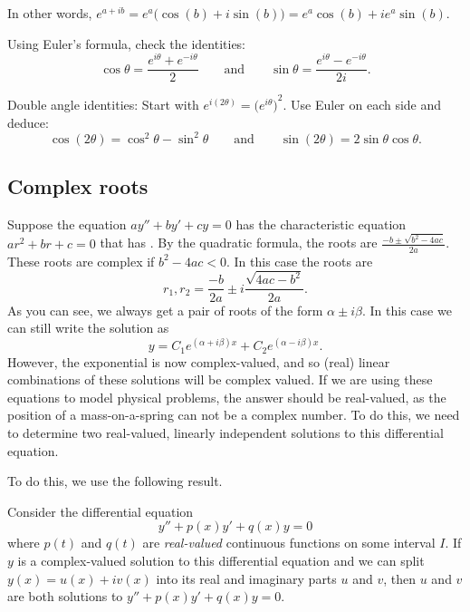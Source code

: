 In other words, $e^{a+ib} = e^a \bigl( \cos(b) + i \sin(b) \bigr) = e^a \cos(b) + i e^a \sin(b)$.

\begin{exercise}
Using Euler's formula, check the identities:
\begin{equation*}
\cos \theta = \frac{e^{i \theta} + e^{-i \theta}}{2}
\qquad \text{and} \qquad
\sin \theta = \frac{e^{i \theta} - e^{-i \theta}}{2i}.
\end{equation*}
\end{exercise}

\begin{exercise}
Double angle identities:
Start with $e^{i(2\theta)} = {\bigl(e^{i \theta} \bigr)}^2$.  Use Euler on
each side and deduce:
\begin{equation*}
\cos (2\theta) = \cos^2 \theta - \sin^2 \theta
\qquad \text{and} \qquad
\sin (2\theta) = 2 \sin \theta \cos \theta .
\end{equation*}
\end{exercise}

\subsection{Complex roots}

Suppose the equation $ay'' + by' + cy = 0$ has the 
characteristic equation
$a r^2 + b r + c = 0$ that has .
By the quadratic
formula, the roots are
$\frac{-b \pm \sqrt{b^2 - 4ac}}{2a}$.
These roots are complex if $b^2 - 4ac < 0$.  In this case the
roots are
\begin{equation*}
r_1, r_2 = \frac{-b}{2a} \pm i\frac{\sqrt{4ac - b^2}}{2a} .
\end{equation*}
As you can see, we always get a pair of roots of the form $\alpha \pm i
\beta$.  In this case we can still write the solution as
\begin{equation*}
y = C_1 e^{(\alpha+i\beta)x} + C_2 e^{(\alpha-i\beta)x} .
\end{equation*}
However, the exponential is now complex-valued, and so (real) linear combinations of these solutions will be complex valued. If we are using these equations to model physical problems, the answer should be real-valued, as the position of a mass-on-a-spring can not be a complex number. To do this, we need to determine two real-valued, linearly independent solutions to this differential equation.

To do this, we use the following result.

\begin{theorem1}{}
Consider the differential equation 
\begin{equation*}
y'' + p(x)y' + q(x)y = 0
\end{equation*}
where $p(t)$ and $q(t)$ are \emph{real-valued} continuous functions on some interval $I$. If $y$ is a complex-valued solution to this differential equation and we can split $y(x) = u(x) + i v(x)$ into its real and imaginary parts $u$ and $v$, then $u$ and $v$ are both solutions to $y'' + p(x)y' + q(x)y = 0$.
\end{theorem1} 

